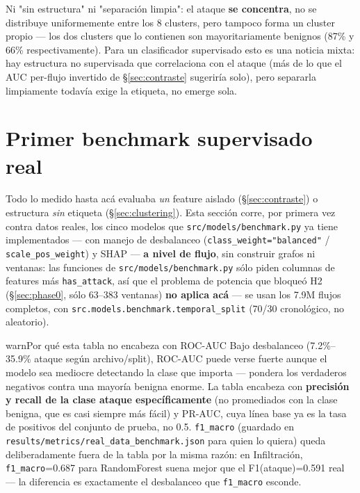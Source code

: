 \documentclass[11pt]{article}
\newcommand{\code}[1]{\texttt{\small #1}}
\begin{document}
Ni "sin estructura" ni "separación limpia": el ataque \textbf{se concentra}, no se
distribuye uniformemente entre los 8 clusters, pero tampoco forma un cluster propio --- los
dos clusters que lo contienen son mayoritariamente benignos (87\% y 66\% respectivamente).
Para un clasificador supervisado esto es una noticia mixta: hay estructura no supervisada
que correlaciona con el ataque (más de lo que el AUC per-flujo invertido de
\S\ref{sec:contraste} sugeriría solo), pero separarla limpiamente todavía exige la
etiqueta, no emerge sola.

\section{Primer benchmark supervisado real}
\label{sec:benchmark}

Todo lo medido hasta acá evaluaba \emph{un} feature aislado (\S\ref{sec:contraste}) o
estructura \emph{sin} etiqueta (\S\ref{sec:clustering}). Esta sección corre, por primera
vez contra datos reales, los cinco modelos que \code{src/models/benchmark.py} ya tiene
implementados --- con manejo de desbalanceo (\code{class\_weight="balanced"} /
\code{scale\_pos\_weight}) y SHAP --- \textbf{a nivel de flujo}, sin construir grafos ni
ventanas: las funciones de \code{src/models/benchmark.py} sólo piden columnas de features
más \code{has\_attack}, así que el problema de potencia que bloqueó H2
(\S\ref{sec:phase0}, sólo 63--383 ventanas) \textbf{no aplica acá} --- se usan los 7.9M
flujos completos, con \code{src.models.benchmark.temporal\_split} (70/30 cronológico, no
aleatorio).

\begin{cbox}{warn}{Por qué esta tabla no encabeza con ROC-AUC}
Bajo desbalanceo (7.2\%--35.9\% ataque según archivo/split), ROC-AUC puede verse fuerte
aunque el modelo sea mediocre detectando la clase que importa --- pondera los verdaderos
negativos contra una mayoría benigna enorme. La tabla encabeza con \textbf{precisión y
recall de la clase ataque específicamente} (no promediados con la clase benigna, que es
casi siempre más fácil) y PR-AUC, cuya línea base ya es la tasa de positivos del
conjunto de prueba, no 0.5. \code{f1\_macro} (guardado en
\code{results/metrics/real\_data\_benchmark.json} para quien lo quiera) queda deliberadamente
fuera de la tabla por la misma razón: en Infiltración, \code{f1\_macro}=0.687 para
RandomForest suena mejor que el F1(ataque)=0.591 real --- la diferencia es exactamente el
desbalanceo que \code{f1\_macro} esconde.
\end{cbox}
\end{document}
